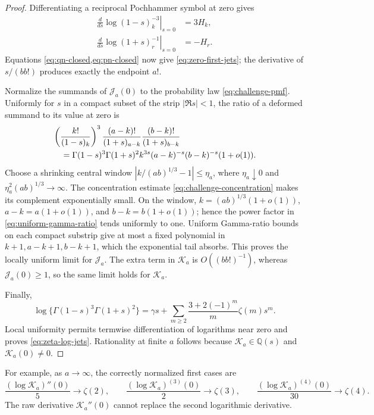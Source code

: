 \documentclass[11pt]{article}
\theoremstyle{keio}
\theoremstyle{definition}
\theoremstyle{remark}
\newcommand{\Q}{\mathbb Q}
\begin{document}
\begin{proof}
Differentiating a reciprocal Pochhammer symbol at zero gives
\begin{align*}
 \left.\frac d{ds}\log(1-s)_k^{-3}\right|_{s=0}&=3H_k,\\
 \left.\frac d{ds}\log(1+s)_r^{-1}\right|_{s=0}&=-H_r.
\end{align*}
Equations \cref{eq:qn-closed,eq:pn-closed} now give
\eqref{eq:zero-first-jets}; the derivative of \(s/(bb!)\) produces exactly
the endpoint \(a!\).

Normalize the summands of \(\mathscr J_a(0)\) to the probability law
\eqref{eq:challenge-pmf}.  Uniformly for \(s\) in a compact subset of the
strip \(|\Re s|<1\), the ratio of a deformed summand to its value at zero is
 \begin{align}
 &\left(\frac{k!}{(1-s)_k}\right)^3
 \frac{(a-k)!}{(1+s)_{a-k}}
 \frac{(b-k)!}{(1+s)_{b-k}}\notag\\
 &\quad=\Gamma(1-s)^3\Gamma(1+s)^2
 k^{3s}(a-k)^{-s}(b-k)^{-s}(1+o(1)).
 \label{eq:uniform-gamma-ratio}
 \end{align}
Choose a shrinking central window
\(|k/(ab)^{1/3}-1|\le\eta_a\), where
\(\eta_a\downarrow0\) and \(\eta_a^2(ab)^{1/3}\to\infty\).
The concentration estimate \eqref{eq:challenge-concentration} makes its
complement exponentially small.  On the window,
\(k=(ab)^{1/3}(1+o(1))\), \(a-k=a(1+o(1))\), and
\(b-k=b(1+o(1))\); hence the power factor in
\eqref{eq:uniform-gamma-ratio} tends uniformly to one.  Uniform Gamma-ratio
bounds on each compact substrip give at most a fixed polynomial in
\(k+1,a-k+1,b-k+1\), which the exponential tail absorbs.  This proves the
locally uniform limit for \(\mathscr J_a\).  The extra term in
\(\mathscr K_a\) is \(O((bb!)^{-1})\), whereas
\(\mathscr J_a(0)\ge1\), so the same limit holds for \(\mathscr K_a\).

Finally,
\begin{equation}\label{eq:Gamma-log-series}
 \log\{\Gamma(1-s)^3\Gamma(1+s)^2\}
 =\gamma s+\sum_{m\ge2}\frac{3+2(-1)^m}{m}\zeta(m)s^m.
\end{equation}
Local uniformity permits termwise differentiation of logarithms near zero
and proves \eqref{eq:zeta-log-jets}.  Rationality at finite \(a\) follows
because \(\mathscr K_a\in\Q(s)\) and \(\mathscr K_a(0)\ne0\).
\end{proof}

For example, as \(a\to\infty\), the correctly normalized first cases are
\begin{equation}\label{eq:first-zeta-jets}
 \frac{(\log\mathscr K_a)''(0)}5\to\zeta(2),\qquad
 \frac{(\log\mathscr K_a)^{(3)}(0)}2\to\zeta(3),\qquad
 \frac{(\log\mathscr K_a)^{(4)}(0)}{30}\to\zeta(4).
\end{equation}
The raw derivative \(\mathscr K_a''(0)\) cannot replace the second
logarithmic derivative.
\end{document}
